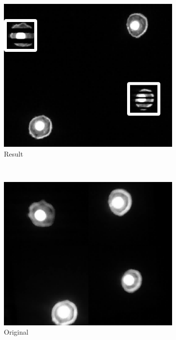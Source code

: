 \begin{figure}[!t]
\begin{subfigure}[h]{0.16\textwidth}
      \includegraphics[width=\textwidth]{pic/bbox/bbox_H_stripedLED_crop.png}
      \caption{Result} \label{fig:bbox_result}
   \end{subfigure}%
   \\
   \begin{subfigure}[h]{0.16\textwidth}
      \includegraphics[width=\textwidth]{pic/bbox/bbox_A_original400_crop.png}
      \caption{Original} \label{fig:bbox_ori}
   \end{subfigure}%
   ~
   \begin{subfigure}[h]{0.16\textwidth}

\end{subfigure}
\end{figure}
